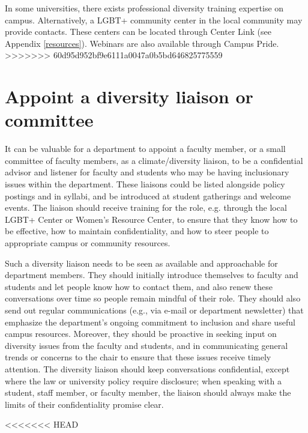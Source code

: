 In some universities, there exists professional diversity training expertise on campus. Alternatively, a LGBT+ community center in the local community may provide contacts. These centers can be located through Center Link (see Appendix \ref{resources}). Webinars are also available through Campus Pride.
>>>>>>> 60d95d952bf9e6111a0047a0b5bd646825775559


\section {Appoint a diversity liaison or committee}
\label{liaison}
It can be valuable for a department to appoint a faculty member, or a small committee of faculty members, as a climate/diversity liaison, to be a confidential advisor and listener for faculty and students who may be having inclusionary issues within the department. These liaisons could be listed alongside policy postings and in syllabi, and be introduced at student gatherings and welcome events. The liaison should receive training for the role, e.g. through the local LGBT+ Center or Women's Resource Center, to ensure that they know how to be effective, how to maintain confidentiality, and how to steer people to appropriate campus or community resources. 

Such a diversity liaison needs to be seen as available and approachable for department members. They should initially introduce themselves to faculty and students and let people know how to contact them, and also renew these conversations over time so people remain mindful of their role. They should also send out regular communications (e.g., via e-mail or department newsletter) that emphasize the department's ongoing commitment to inclusion and share useful campus resources. Moreover, they should be proactive in seeking input on diversity issues from the faculty and students, and in communicating general trends or concerns to the chair to ensure that these issues receive timely attention. The diversity liaison should keep conversations confidential, except where the law or university policy require disclosure; when speaking with a student, staff member, or faculty member, the liaison should always make the limits of their confidentiality promise clear.


<<<<<<< HEAD
